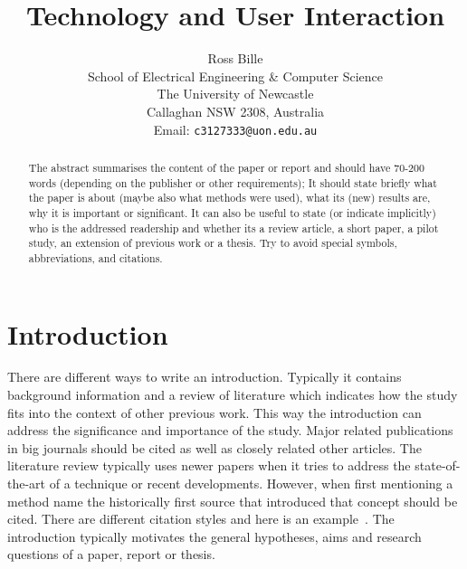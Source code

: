 \documentclass[a4,12pt]{article}
\begin{document}
%
\title{\bf Technology and User Interaction }
%
\author{Ross Bille\\
School of Electrical Engineering \& Computer Science\\
The University of Newcastle\\ Callaghan NSW 2308, Australia\\
Email: \texttt{c3127333@uon.edu.au} } 

\maketitle


\newpage
\begin{abstract}%
\noindent The abstract summarises the content of the paper or report and should have 70-200 words (depending on the publisher or other requirements); It
should state briefly what the paper is about (maybe also what
methods were used), what its (new) results are, why it is
important or significant. It can also be useful to state (or
indicate implicitly) who is the addressed readership and whether
its a review article, a short paper, a pilot study, an
extension of previous work or a thesis. Try to avoid special symbols, abbreviations, and citations.
\end{abstract}

\pagebreak

\tableofcontents

\pagebreak

\section{Introduction}

There are different ways to write an introduction. Typically it
contains background information and a review of literature which
indicates how the study fits into the context of other previous
work. This way the introduction can  address the significance and importance of the study. Major related publications in big journals should be cited
as well as closely related other articles. The literature review typically uses newer papers when it tries to address the state-of-the-art of a technique or recent developments. However, when first mentioning a method name the historically first source that introduced that concept should be cited. There are different citation styles and here is an example~\citep{QuinlanChalupMiddletonACRA2003}. The introduction
typically motivates the general hypotheses, aims and research questions
of a paper, report or thesis.  
\end{document}
